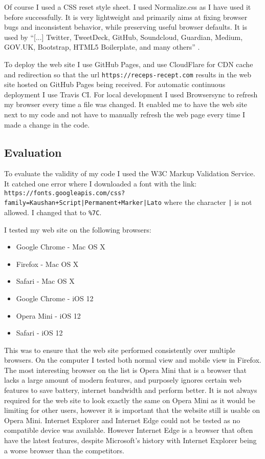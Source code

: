 \documentclass[a4paper]{scrartcl}
\begin{document}
Of course I used a CSS reset style sheet. I used Normalize.css as I have used it before successfully. It is very lightweight and primarily aims at fixing browser bugs and inconsistent behavior, while preserving useful browser defaults. It is used by ``[...] Twitter, TweetDeck, GitHub, Soundcloud, Guardian, Medium, GOV.UK, Bootstrap, HTML5 Boilerplate, and many others'' \cite{Gallagher}.

To deploy the web site I use GitHub Pages, and use CloudFlare for CDN cache and redirection so that the url \texttt{https://receps-recept.com} results in the web site hosted on GitHub Pages being received. For automatic continuous deployment I use Travis CI. For local development I used Browsersync to refresh my browser every time a file was changed. It enabled me to have the web site next to my code and not have to manually refresh the web page every time I made a change in the code.

\subsection{Evaluation}
\label{method:evaluation}

To evaluate  the validity of my code I used the W3C Markup Validation Service. It catched one error where I downloaded a font with the link:\\ \small{\texttt{https://fonts.googleapis.com/css?family=Kaushan+Script|Permanent+Marker|Lato}} where the character \texttt{|} is not allowed. I changed that to \texttt{\%7C}.

I tested my web site on the following browsers:
\begin{itemize}
	\item Google Chrome - Mac OS X
	\item Firefox - Mac OS X
	\item Safari - Mac OS X
	\item Google Chrome - iOS 12
	\item Opera Mini - iOS 12
	\item Safari - iOS 12
\end{itemize}

This was to ensure that the web site performed consistently over multiple browsers. On the computer I tested both normal view and mobile view in Firefox. The most interesting browser on the list is Opera Mini that is a browser that lacks a large amount of modern features, and purposely ignores certain web features to save battery, internet bandwidth and perform better. It is not always required for the web site to look exactly the same on Opera Mini as it would be limiting for other users, however it is important that the website still is usable on Opera Mini. Internet Explorer and Internet Edge could not be tested as no compatible device was available. However Internet Edge is a browser that often have the latest features, despite Microsoft's history with Internet Explorer being a worse browser than the competitors.
\end{document}
